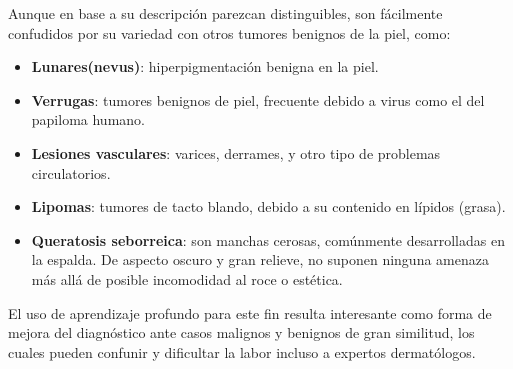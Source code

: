 Aunque en base a su descripción parezcan distinguibles, son fácilmente confudidos por su variedad con otros tumores benignos de la piel, como:

\begin{itemize}
	\item \textbf{Lunares(nevus)}: hiperpigmentación benigna en la piel.
	\item \textbf{Verrugas}: tumores benignos de piel, frecuente debido a virus como el del papiloma humano.
	\item \textbf{Lesiones vasculares}: varices, derrames, y otro tipo de problemas circulatorios.
	\item \textbf{Lipomas}: tumores de tacto blando, debido a su contenido en lípidos (grasa).
	\item \textbf{Queratosis seborreica}: son manchas cerosas, comúnmente desarrolladas en la espalda. De aspecto oscuro y gran relieve, no suponen ninguna amenaza más allá de posible incomodidad al roce o estética.
\end{itemize}

El uso de aprendizaje profundo para este fin resulta interesante como forma de mejora del diagnóstico ante casos malignos y benignos de gran similitud, los cuales pueden confunir y dificultar la labor incluso a expertos dermatólogos.

